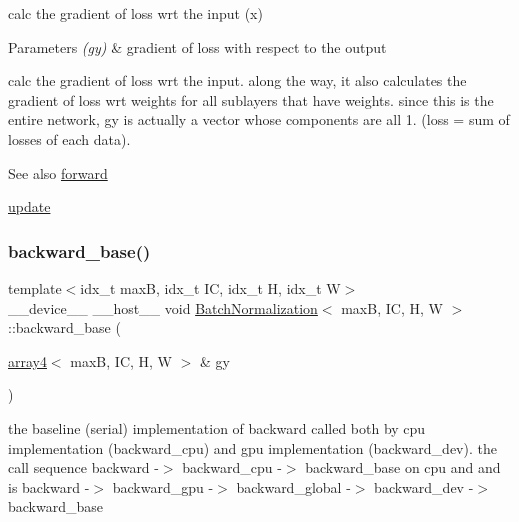 calc the gradient of loss wrt the input (x) 


\begin{DoxyParams}{Parameters}
{\em (gy)} & gradient of loss with respect to the output\\
\hline
\end{DoxyParams}
calc the gradient of loss wrt the input. along the way, it also calculates the gradient of loss wrt weights for all sublayers that have weights. since this is the entire network, gy is actually a vector whose components are all 1. (loss = sum of losses of each data). \begin{DoxySeeAlso}{See also}
\hyperlink{structBatchNormalization_a315cda9d48dfa18a2f4f65ac7bb3b891}{forward} 

\hyperlink{structBatchNormalization_a71b4c3d0b5002d84ba2d74f47f7ab8d2}{update} 
\end{DoxySeeAlso}
\mbox{\label{structBatchNormalization_a0ef45335c50151f68de03d33b1d226ca}} 
\subsubsection{\texorpdfstring{backward\+\_\+base()}{backward\_base()}}
{\footnotesize\ttfamily template$<$idx\+\_\+t maxB, idx\+\_\+t IC, idx\+\_\+t H, idx\+\_\+t W$>$ \\
\+\_\+\+\_\+device\+\_\+\+\_\+ \+\_\+\+\_\+host\+\_\+\+\_\+ void \hyperlink{structBatchNormalization}{Batch\+Normalization}$<$ maxB, IC, H, W $>$\+::backward\+\_\+base (\begin{DoxyParamCaption}\item[{\hyperlink{structarray4}{array4}$<$ maxB, IC, H, W $>$ \&}]{gy }\end{DoxyParamCaption})\hspace{0.3cm}{\ttfamily [inline]}}



the baseline (serial) implementation of backward called both by cpu implementation (backward\+\_\+cpu) and gpu implementation (backward\+\_\+dev). the call sequence backward -\/$>$ backward\+\_\+cpu -\/$>$ backward\+\_\+base on cpu and and is backward -\/$>$ backward\+\_\+gpu -\/$>$ backward\+\_\+global -\/$>$ backward\+\_\+dev -\/$>$ backward\+\_\+base 


